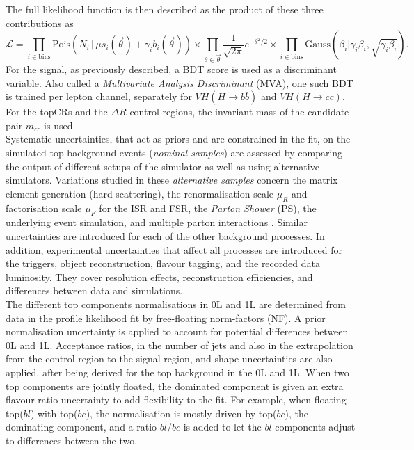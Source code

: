 The full likelihood function is then described as the product of these three contributions as 
\begin{equation}
\mathcal{L} = \prod_{i\in \textrm{bins}} \textrm{Pois}(N_i \,|\, \mu s_i(\overrightarrow{\theta}) + \gamma_i b_i(\overrightarrow{\theta})) \times  \prod_{\theta \in \overrightarrow{\theta}} \frac{1}{\sqrt{2\pi}} e^{- \theta^2/2} \times \prod_{i \in \textrm{bins}} \textrm{Gauss}(\beta_i | \gamma_i \beta_i, \sqrt{\gamma_i \beta_i}).
\end{equation}
For the signal, as previously described, a BDT score is used as a discriminant variable. Also called a \textit{Multivariate Analysis Discriminant} (MVA), one such BDT is trained per lepton channel, separately for $VH(H\rightarrow b\bar{b})$ and $VH(H\rightarrow c\bar{c})$. For the topCRs and the $\Delta R$ control regions, the invariant mass of the candidate pair  $m_{c\bar{c}}$ is used. \\

Systematic uncertainties, that act as priors and are constrained in the fit, on the simulated top background events (\textit{nominal samples}) are assessed by comparing the output of different setups of the simulator as well as using alternative simulators. Variations studied in these \textit{alternative samples} concern the matrix element generation (hard scattering), the renormalisation scale $\mu_R$ and factorisation scale $\mu_F$ for the ISR and FSR, the \textit{Parton Shower} (PS), the underlying event simulation, and multiple parton interactions \cite{Mironova:2837159}. Similar uncertainties are introduced for each of the other background processes. In addition, experimental uncertainties that affect all processes are introduced for the triggers, object reconstruction, flavour tagging, and the recorded data luminosity. They cover resolution effects, reconstruction efficiencies, and differences between data and simulations.\\

The different top components normalisations in 0L and 1L are determined from data in the profile likelihood fit by free-floating norm-factors (NF). A prior normalisation uncertainty is applied to account for potential differences between 0L and 1L. Acceptance ratios, in the number of jets and also in the extrapolation from the control region to the signal region, and shape uncertainties are also applied, after being derived for the top background in the 0L and 1L. When two top components are jointly floated, the dominated component is given an extra flavour ratio uncertainty to add flexibility to the fit. For example, when floating top($bl$) with top($bc$), the normalisation is mostly driven by top($bc$), the dominating component, and a ratio $bl$/$bc$ is added to let the $bl$ components adjust to differences between the two.  \\

